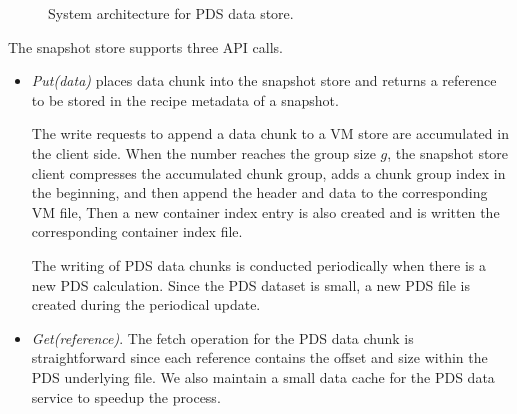 \begin{figure}[htbp]
  \centering
  \caption{System architecture for PDS data store.}
  \label{fig:as_arch}
\end{figure}

The snapshot  store supports three API calls.
\begin{itemize}

\item {\em Put(data)} places data chunk into the snapshot store and returns a reference to be stored in 
the recipe metadata of a snapshot. 

The write requests to append a data chunk to a VM store are accumulated in the client side. 
When the number reaches the group size $g$, the snapshot store client compresses
the accumulated   chunk group, adds a chunk group index  in the beginning, and then
append the header and data  to the corresponding VM file,
Then a new container  index entry is also created and is written the corresponding
container index file.

The writing of PDS data chunks is conducted periodically when there is a new PDS calculation.
Since the PDS dataset is small, a new PDS file is created during the periodical update.
\item{\em Get(reference)}.
The fetch operation for the PDS data chunk is straightforward since each reference contains 
the offset and size within the PDS  underlying  file.
We also maintain a small data cache for the PDS data service to speedup the process.


\end{itemize}
